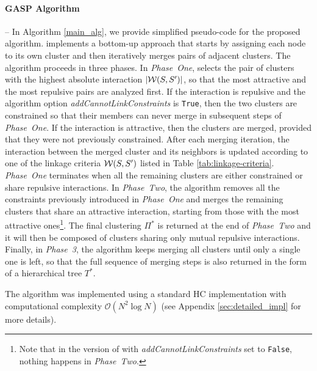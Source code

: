 \paragraph*{GASP Algorithm} -- In Algorithm \ref{main_alg}, we provide simplified pseudo-code for the proposed \algname{} algorithm. \algname{} implements a bottom-up approach that starts by assigning each node to its own cluster and then iteratively merges pairs of adjacent clusters. The algorithm proceeds in three phases. 
In \emph{Phase~One}, \algname{} selects the pair of clusters with the highest absolute interaction $|\mathcal{W}(S, S')|$, so that the most attractive and the most repulsive pairs are analyzed first. If the interaction is repulsive and the algorithm option \emph{addCannotLinkConstraints} is \texttt{True}, then the two clusters are constrained so that their members can never merge in subsequent steps of \emph{Phase~One}. If the interaction is attractive, then the clusters are merged, provided that they were not previously constrained. 
After each merging iteration, the interaction between the merged cluster and its neighbors is updated according to one of the linkage criteria $\mathcal{W}(S, S')$ listed in Table \ref{tab:linkage-criteria}. \emph{Phase~One} terminates when all the remaining clusters are either constrained or share repulsive interactions.
In \emph{Phase~Two}, the algorithm removes all the constraints previously introduced in \emph{Phase~One} and merges the remaining clusters that share an attractive interaction, starting from those with the most attractive ones\footnote{Note that in the version of \algname{} with \emph{addCannotLinkConstraints} set to \texttt{False}, nothing happens in \emph{Phase~Two}.}. The final \algname{} clustering $\Pi^*$ is returned at the end of \emph{Phase~Two} and it will then be composed of clusters sharing only mutual repulsive interactions. 
Finally, in \emph{Phase~3}, the algorithm keeps merging all clusters until only a single one is left, so that the full sequence of merging steps is also returned in the form of a hierarchical tree $T^*$.

The algorithm was implemented using a standard HC implementation with computational complexity $\mathcal{O}(N^2 \log N)$ (see Appendix \ref{sec:detailed_impl} for more details). 


